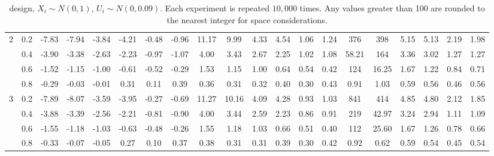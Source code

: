 \begin{table}
\begin{threeparttable}
\begin{tabular}{c c|c c c c c c|c c c c c c|c c c c c c}
\hline
\multirow{4}{*}{2} & 0.2 & -7.83 & -7.94 & -3.84 & -4.21 & -0.48 & -0.96 & 11.17 & 9.99 & 4.33 & 4.54 & 1.06 & 1.24 & 376 & 398 & 5.15 & 5.13 & 2.19 & 1.98 \\
& 0.4 & -3.90 & -3.38 & -2.63 & -2.23 & -0.97 & -1.07 & 4.00 & 3.43 & 2.67 & 2.25 & 1.02 & 1.08 & 58.21 & 164 & 3.36 & 3.02 & 1.27 & 1.27 \\
& 0.6 & -1.52 & -1.15 & -1.00 & -0.61 & -0.52 & -0.29 & 1.53 & 1.15 & 1.00 & 0.64 & 0.54 & 0.42 & 124 & 16.25 & 1.67 & 1.22 & 0.84 & 0.71 \\
& 0.8 & -0.29 & -0.03 & -0.01 & 0.31 & 0.11 & 0.39 & 0.36 & 0.31 & 0.32 & 0.40 & 0.30 & 0.43 & 0.91 & 1.03 & 0.59 & 0.56 & 0.46 & 0.56 \\
\hline
\multirow{4}{*}{3} & 0.2 & -7.89 & -8.07 & -3.59 & -3.95 & -0.27 & -0.69 & 11.27 & 10.16 & 4.09 & 4.28 & 0.93 & 1.03 & 841 & 414 & 4.85 & 4.80 & 2.12 & 1.85 \\
& 0.4 & -3.88 & -3.39 & -2.56 & -2.21 & -0.81 & -0.90 & 4.00 & 3.44 & 2.59 & 2.23 & 0.86 & 0.91 & 219 & 42.97 & 3.24 & 2.94 & 1.11 & 1.09 \\
& 0.6 & -1.55 & -1.18 & -1.03 & -0.63 & -0.48 & -0.26 & 1.55 & 1.18 & 1.03 & 0.66 & 0.51 & 0.40 & 112 & 25.60 & 1.67 & 1.26 & 0.78 & 0.66 \\
& 0.8 & -0.33 & -0.07 & -0.05 & 0.27 & 0.10 & 0.37 & 0.38 & 0.31 & 0.31 & 0.39 & 0.30 & 0.42 & 0.92 & 0.62 & 0.59 & 0.54 & 0.45 & 0.54 \\
\hline
\hline
\end{tabular}
\caption*{\citet{ludwig2007does} design, $X_i \sim N(0,1)$, $U_i \sim N(0,0.09)$. Each experiment is repeated $10,000$ times. Any values greater than 100 are rounded to the nearest integer for space considerations.}
\label{table estimation lm normal}
\end{threeparttable}
\end{table}
